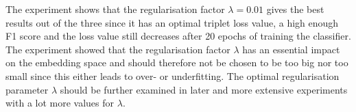 \newline
\newline
The experiment shows that the regularisation factor $\lambda = 0.01$ gives the best results out of the three since it has an optimal triplet loss value, a high enough F1 score and the loss value still decreases after 20 epochs of training the classifier.
\newline
\newline
The experiment showed that the regularisation factor $\lambda$ has an essential impact on the embedding space and should therefore not be chosen to be too big nor too small since this either leads to over- or underfitting. The optimal regularisation parameter $\lambda$ should be further examined in later and more extensive experiments with a lot more values for $\lambda$.

